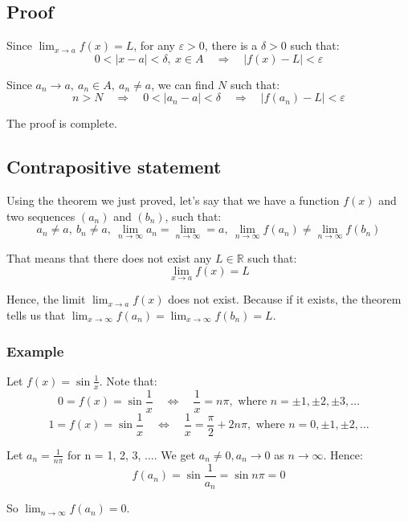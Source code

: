 \documentclass[11pt]{article}
\begin{document}
\subsection{Proof}
\label{sec:org7650c61}
Since \(\lim_{x \rightarrow a} f(x) = L\), for any \(\varepsilon > 0\), there is a \(\delta > 0\) such that:
\[0 < |x - a| < \delta, \ x \in A \quad \Rightarrow \quad |f(x) - L| < \varepsilon\]

Since \(a_n \rightarrow a, \ a_n \in A, \ a_n \neq a\), we can find \(N\) such that:
\[n > N \quad \Rightarrow \quad 0 < |a_n - a| < \delta \quad \Rightarrow \quad |f(a_n) - L| < \varepsilon\]

The proof is complete.

\subsection{Contrapositive statement}
\label{sec:org61d22a6}
Using the theorem we just proved, let's say that we have a function \(f(x)\) and two sequences \((a_n)\) and \((b_n)\), such that:
\[a_n \neq a, \ b_n \neq a, \ \lim_{n \rightarrow \infty} a_n = \lim_{n \rightarrow \infty} = a, \ \lim_{n \rightarrow \infty} f(a_n) \neq \lim_{n \rightarrow \infty} f(b_n)\]

That means that there does not exist any \(L \in \mathbb{R}\) such that:
\[\lim_{x \rightarrow a} f(x) = L\]

Hence, the limit \(\lim_{x \rightarrow a} f(x)\) does not exist. Because if it exists, the theorem tells us that \(\lim_{x \rightarrow \infty} f(a_n) = \lim_{x \rightarrow \infty} f(b_n) = L\).

\newpage

\subsubsection{Example}
\label{sec:orgf3993ce}
Let \(f(x) = \sin \frac{1}{x}\). Note that:
\[0 = f(x) = \sin \frac{1}{x} \quad \Leftrightarrow \quad \frac{1}{x} = n\pi, \text{ where } n = \pm 1, \pm 2, \pm 3, \ldots\]
\[1 = f(x) = \sin \frac{1}{x} \quad \Leftrightarrow \quad \frac{1}{x} = \frac{\pi}{2} + 2n\pi, \text{ where } n = 0, \pm 1, \pm 2, \ldots\]

Let \(a_n = \frac{1}{n\pi}\) for n = 1, 2, 3, \(\ldots\). We get \(a_n \neq 0, a_n \rightarrow 0\) as \(n \rightarrow \infty\). Hence:
\[f(a_n) = \sin \frac{1}{a_n} = \sin n\pi = 0\]

So \(\lim_{n \rightarrow \infty} f(a_n) = 0\).
\\[0pt]
\end{document}

